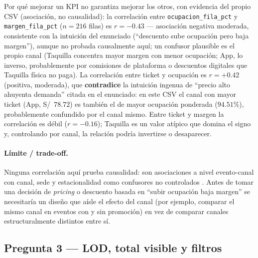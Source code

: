 Por qué mejorar un KPI no garantiza mejorar los otros, con evidencia del propio CSV (asociación, no causalidad): la correlación entre \lstinline|ocupacion_fila_pct| y \lstinline|margen_fila_pct| ($n=216$ filas) es $r=-0.43$ — asociación negativa moderada, consistente con la intuición del enunciado (\enquote{descuento sube ocupación pero baja margen}), aunque no probada causalmente aquí; un confusor plausible es el propio canal (Taquilla concentra mayor margen con menor ocupación; App, lo inverso, probablemente por comisiones de plataforma o descuentos digitales que Taquilla física no paga). La correlación entre ticket y ocupación es $r=+0.42$ (positiva, moderada), que \textbf{contradice} la intuición ingenua de \enquote{precio alto ahuyenta demanda} citada en el enunciado: en este CSV el canal con mayor ticket (App, S/~$78.72$) es también el de mayor ocupación ponderada ($94.51\%$), probablemente confundido por el canal mismo. Entre ticket y margen la correlación es débil ($r=-0.16$); Taquilla es un valor atípico que domina el signo y, controlando por canal, la relación podría invertirse o desaparecer.

\paragraph{Límite / trade-off.} Ninguna correlación aquí prueba causalidad: son asociaciones a nivel evento-canal con canal, sede y estacionalidad como confusores no controlados \citep{simpson1951interpretation}. Antes de tomar una decisión de \emph{pricing} o descuento basada en \enquote{subir ocupación baja margen} se necesitaría un diseño que aísle el efecto del canal (por ejemplo, comparar el mismo canal en eventos con y sin promoción) en vez de comparar canales estructuralmente distintos entre sí.

\subsection{Pregunta 3 --- LOD, total visible y filtros}\label{ssec:c1-q3}

